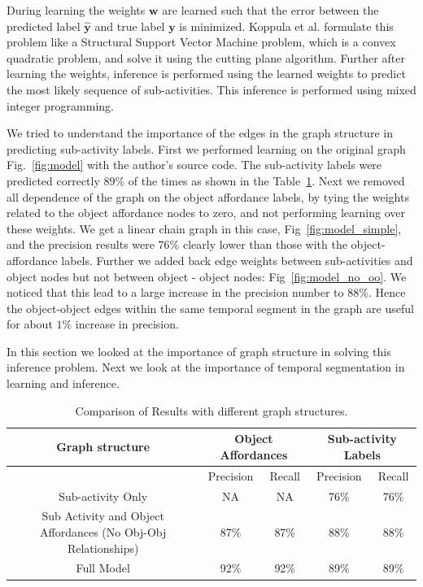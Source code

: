 \documentclass{article} %
\begin{document}
During learning the weights $\mathbf{w}$ are learned such that the error between the predicted label $\hat{\mathbf{y}}$ and true label $\mathbf{y}$  is minimized. Koppula et al. \cite{koppula2013detectingactivitiesrgbd} formulate this problem like a Structural Support Vector Machine problem, which is a convex quadratic problem, and solve it using the cutting plane algorithm. Further after learning the weights, inference is performed using the learned weights to predict the most likely sequence of sub-activities. This inference is performed using mixed integer programming.


We tried to understand the importance of the edges in the graph structure in predicting sub-activity labels. First we performed learning on the original graph Fig.~\ref{fig:model} with the author's source code. The sub-activity labels were predicted correctly $89\%$ of the times as shown in the Table~\ref{table:graphComparison}. Next we removed all dependence of the graph on the object affordance labels,  by tying the weights related to the object affordance nodes to zero, and not performing learning over these weights. We get a linear chain graph in this case, Fig~\ref{fig:model_simple}, and the precision results were $76\%$ clearly lower than those with the object-affordance labels. Further we added back edge weights between sub-activities and object nodes but not between object - object nodes: Fig~\ref{fig:model_no_oo}. We noticed that this lead to a large increase in the precision number to $88\%$. Hence the object-object edges within the same temporal segment in the graph are useful for about $1\%$ increase in precision. 

In this section we looked at the importance of graph structure in solving this inference problem. Next we look at the importance of temporal segmentation in learning and inference.








\begin{table}[tbp]
\centering
\caption{Comparison of Results with different graph structures.}
\label{table:graphComparison}
\begin{tabular}{*5c}
\toprule
Graph structure &  \multicolumn{2}{c}{Object Affordances} & \multicolumn{2}{c}{Sub-activity Labels}\\
\midrule
{}   & Precision   & Recall    & Precision   & Recall\\
Sub-activity Only   &  NA & NA   & 76\%  & 76\%  \\
Sub Activity and Object Affordances (No Obj-Obj Relationships)   &  87\%   & 87\%     & 88\%    & 88\%  \\
Full Model   &  92\%    &  92\%     & 89\%    & 89\%  \\
\bottomrule
\end{tabular}
\end{table}
\end{document}
